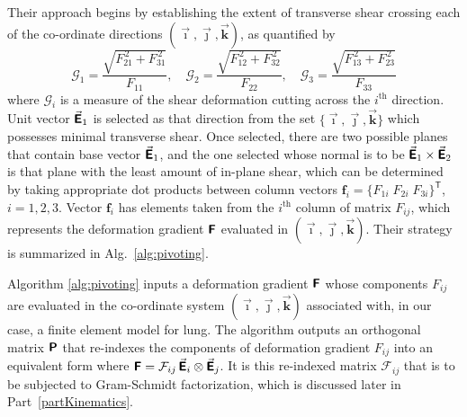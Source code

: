 Their approach begins by establishing the extent of transverse shear crossing each of the co-ordinate directions $( \vec{\boldsymbol{\imath}} , \vec{\boldsymbol{\jmath}} , \vec{\boldsymbol{k}} )$, as quantified by
\begin{equation}
\mathcal{G}_1 =\dfrac{\sqrt{F^{\,2}_{21}+F^{\,2}_{31}}}{F_{11}} , \quad
\mathcal{G}_2 =\dfrac{\sqrt{F^{\,2}_{12}+F^{\,2}_{32}}}{F_{22}} , \quad
\mathcal{G}_3 =\dfrac{\sqrt{F^{\,2}_{13}+F^{\,2}_{23}}}{F_{33}}
\end{equation} 
where $\mathcal{G}_i$ is a measure of the shear deformation cutting across the $i^{\text{th}}$ direction.  Unit vector $\vec{\boldsymbol{\mathsf{E}}}_1$ is selected as that direction from the set $\{ \vec{\boldsymbol{\imath}} , \vec{\boldsymbol{\jmath}} , \vec{\boldsymbol{k}} \}$ which possesses minimal transverse shear.  Once selected, there are two possible planes that contain base vector $\vec{\boldsymbol{\mathsf{E}}}_1$, and the one selected whose normal is to be $\vec{\boldsymbol{\mathsf{E}}}_1 \times \vec{\boldsymbol{\mathsf{E}}}_2$ is that plane with the least amount of in-plane shear, which can be determined by taking appropriate dot products between column vectors $\boldsymbol{f}_i = \{ F_{1i} \; F_{2i} \; F_{3i} \}^{\mathsf{T}}$, $i=1,2,3$.  Vector $\boldsymbol{f}_i$ has elements taken from the $i^{\text{th}}$ column of matrix $F_{ij}$, which represents the deformation gradient $\boldsymbol{\mathsf{F}}$ evaluated in $( \vec{\boldsymbol{\imath}} , \vec{\boldsymbol{\jmath}} , \vec{\boldsymbol{k}} )$.  Their strategy is summarized in Alg.~\ref{alg:pivoting}.

Algorithm \ref{alg:pivoting} inputs a deformation gradient $\boldsymbol{\mathsf{F}}$ whose components $F_{ij}$ are evaluated in the co-ordinate system $(  \vec{\boldsymbol{\imath}} , \vec{\boldsymbol{\jmath}} , \vec{\boldsymbol{k}} )$ associated with, in our case, a finite element model for lung.  The algorithm outputs an orthogonal matrix $\boldsymbol{\mathsf{P}}$ that re-indexes the components of deformation gradient $F_{ij}$ into an equivalent form where $\boldsymbol{\mathsf{F}} = \mathcal{F}_{ij} \, \vec{\boldsymbol{\mathsf{E}}}_i \otimes \vec{\boldsymbol{\mathsf{E}}}_j$.  It is this re-indexed matrix $\mathcal{F}_{ij}$ that is to be subjected to Gram-Schmidt factorization, which is discussed later in Part~\ref{partKinematics}.  

